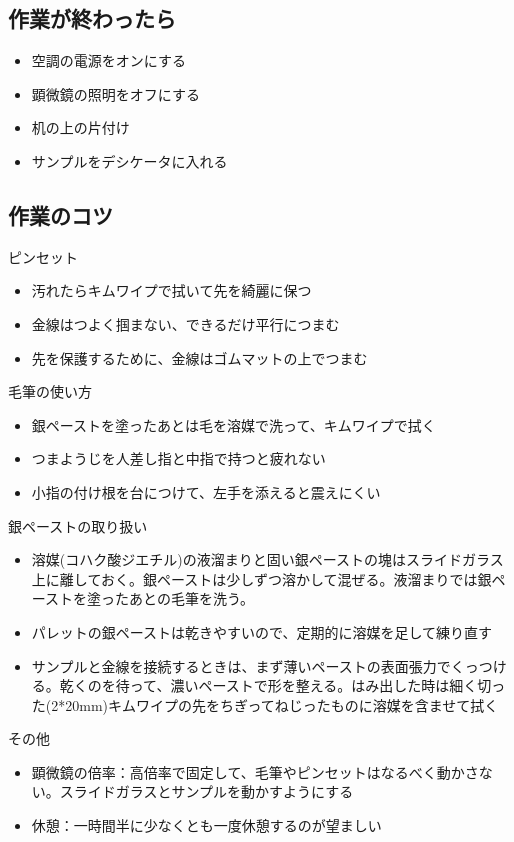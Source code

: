 \documentclass[11pt,a4paper]{jsarticle}
\begin{document}
\subsection{作業が終わったら} 
\begin{itemize}
\item 空調の電源をオンにする
\item 顕微鏡の照明をオフにする
\item 机の上の片付け
\item サンプルをデシケータに入れる
\end{itemize}
 
 \subsection{作業のコツ} 
ピンセット
\begin{itemize}
\item 汚れたらキムワイプで拭いて先を綺麗に保つ
\item 金線はつよく掴まない、できるだけ平行につまむ
\item 先を保護するために、金線はゴムマットの上でつまむ
\end{itemize}
 
毛筆の使い方
\begin{itemize}
\item 銀ペーストを塗ったあとは毛を溶媒で洗って、キムワイプで拭く
\item つまようじを人差し指と中指で持つと疲れない
\item 小指の付け根を台につけて、左手を添えると震えにくい
\end{itemize}

銀ペーストの取り扱い
\begin{itemize}
\item 溶媒(コハク酸ジエチル)の液溜まりと固い銀ペーストの塊はスライドガラス上に離しておく。銀ペーストは少しずつ溶かして混ぜる。液溜まりでは銀ペーストを塗ったあとの毛筆を洗う。
\item パレットの銀ペーストは乾きやすいので、定期的に溶媒を足して練り直す
\item サンプルと金線を接続するときは、まず薄いペーストの表面張力でくっつける。乾くのを待って、濃いペーストで形を整える。はみ出した時は細く切った(2*20mm)キムワイプの先をちぎってねじったものに溶媒を含ませて拭く
\end{itemize}

その他
\begin{itemize}
\item 顕微鏡の倍率：高倍率で固定して、毛筆やピンセットはなるべく動かさない。スライドガラスとサンプルを動かすようにする
\item 休憩：一時間半に少なくとも一度休憩するのが望ましい
\end{itemize}
\end{document}
